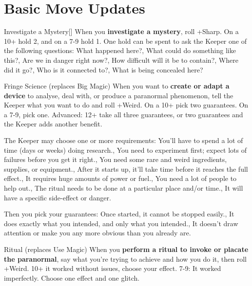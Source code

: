 \documentclass[12pt,oneside,landscape]{memoir}
\begin{document}
\chapter*{Basic Move Updates}
\begin{multicols}{4}
\begin{pbsect}{Investigate a Mystery}[]
When you \textbf{investigate a mystery}, roll +Sharp. On a 10+ hold 2, and on a 7-9 hold 1. One hold can be spent to ask the Keeper one of the following questions:
\holdoptions%
    {What happened here?,
    What could do something like this?,
    Are we in danger right now?,
    How difficult will it be to contain?,
    Where did it go?,
    Who is it connected to?,
    What is being concealed here?}
\end{pbsect}
%
\begin{pbsect}{Fringe Science (replaces Big Magic)}
When you want to \textbf{create or adapt a device} to analyse, deal with, or produce a paranormal phenomenon, tell the Keeper what you want to do and roll +Weird.  On a 10+ pick two guarantees.  On a 7-9, pick one.
\br[2mm]
%
Advanced: 12+ take all three guarantees, or two guarantees and the Keeper adds another benefit.
\end{pbsect}%
\br[2mm]
%
\begin{blurb*}{The Keeper may choose one or more requirements:}%
\holdoptions%
    {{You’ll have to spend a lot of time (days or weeks) doing research.},
    {You need to experiment first; expect lots of failures before you get it right.},
    {You need some rare and weird ingredients, supplies, or equipment.},
    {After it starts up, it’ll take time before it reaches the full effect.},
    {It requires huge amounts of power or fuel.},
    {You need a lot of people to help out.},
    {The ritual needs to be done at a particular place and/or time.},
    {It will have a specific side-effect or danger.}}
\end{blurb*}
%
\begin{blurb*}{Then you pick your guarantees:}
\holdoptions%
    {{Once started, it cannot be stopped easily.},
    {It does exactly what you intended, and only what you intended.},
    {It doesn’t draw attention or make you any more obvious than you already are.}}
\end{blurb*}
%
\begin{pbsect}{Ritual (replaces Use Magic)}
When you \textbf{perform a ritual to invoke or placate the paranormal}, say what you’re trying to achieve and how you do it, then roll +Weird.  10+ it worked without issues, choose your effect.  7-9: It worked imperfectly.  Choose one effect and one glitch.

\end{pbsect}
\end{multicols}
\end{document}
